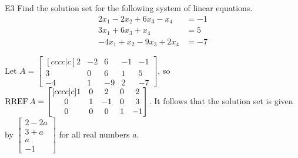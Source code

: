 \documentclass{sbgLAsemi}
\begin{document}
\begin{problem}{E3}
Find the solution set for the following system of linear equations.
\begin{align*}
2x_1-2x_2+6x_3-x_4 &=-1 \\
3x_1+6x_3+x_4 &= 5 \\
-4x_1+x_2-9x_3+2x_4&=-7
\end{align*}
\end{problem}
\begin{solution}
Let \(A =
  \begin{bmatrix}[cccc|c]
    2 & -2 & 6 & -1 & -1 \\
    3 & 0 & 6 & 1 & 5 \\
    -4 & 1 & -9 & 2 & -7
  \end{bmatrix}
\), so \(\operatorname{RREF} A =
  \begin{bmatrix}[cccc|c]
    1 & 0 & 2 & 0 & 2 \\
    0 & 1 & -1 & 0 & 3 \\
    0 & 0 & 0 & 1 & -1
  \end{bmatrix}
\). It follows that the solution set is given by \(
  \begin{bmatrix}
    2 - 2a \\
    3 + a \\
    a \\
    -1
  \end{bmatrix}
\) for all real numbers \(a\).
\end{solution}
\end{document}
